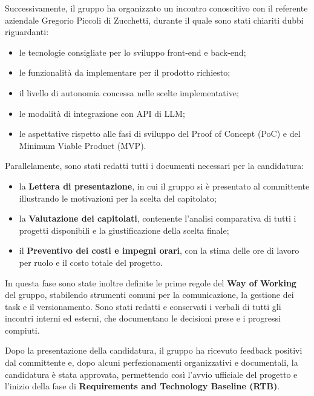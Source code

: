 \documentclass[11pt,a4paper]{article}
\begin{document}
Successivamente, il gruppo ha organizzato un incontro conoscitivo con il referente aziendale Gregorio Piccoli di Zucchetti, durante il quale sono stati chiariti dubbi riguardanti:
\begin{itemize}
    \item le tecnologie consigliate per lo sviluppo front-end e back-end;
    \item le funzionalità da implementare per il prodotto richiesto;
    \item il livello di autonomia concessa nelle scelte implementative;
    \item le modalità di integrazione con API di LLM;
    \item le aspettative rispetto alle fasi di sviluppo del Proof of Concept (PoC) e del Minimum Viable Product (MVP).
\end{itemize}

Parallelamente, sono stati redatti tutti i documenti necessari per la candidatura:
\begin{itemize}
    \item la \textbf{Lettera di presentazione}, in cui il gruppo si è presentato al committente illustrando le motivazioni per la scelta del capitolato;
    \item la \textbf{Valutazione dei capitolati}, contenente l'analisi comparativa di tutti i progetti disponibili e la giustificazione della scelta finale;
    \item il \textbf{Preventivo dei costi e impegni orari}, con la stima delle ore di lavoro per ruolo e il costo totale del progetto.
\end{itemize}

In questa fase sono state inoltre definite le prime regole del \textbf{Way of Working} del gruppo, stabilendo strumenti comuni per la comunicazione, la gestione dei task e il versionamento. Sono stati redatti e conservati i verbali di tutti gli incontri interni ed esterni, che documentano le decisioni prese e i progressi compiuti.

Dopo la presentazione della candidatura, il gruppo ha ricevuto feedback positivi dal committente e, dopo alcuni perfezionamenti organizzativi e documentali, la candidatura è stata approvata, permettendo così l'avvio ufficiale del progetto e l'inizio della fase di \textbf{Requirements and Technology Baseline (RTB)}.

\newpage

\end{document}
